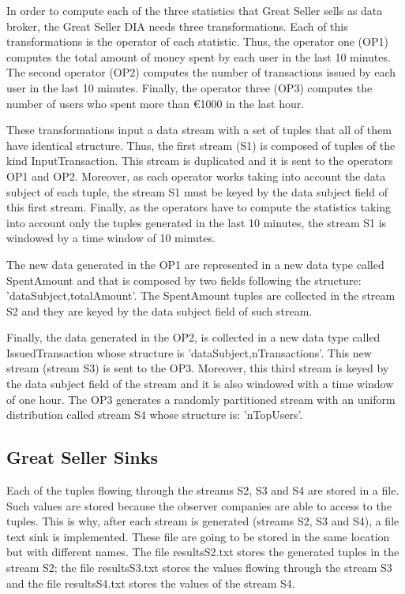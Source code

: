 In order to compute each of the three statistics that Great Seller sells as data broker, the Great Seller DIA needs three transformations. Each of this transformations is the operator of each statistic. Thus, the operator one (OP1) computes the total amount of money spent by each user in the last 10 minutes. The second operator (OP2) computes the number of transactions issued by each user in the last 10 minutes. Finally, the operator three (OP3) computes the number of users who spent more than \euro{1000} in the last hour.

These transformations input a data stream with a set of tuples that all of them have identical structure. Thus, the first stream (S1) is composed of tuples of the kind InputTransaction. This stream is duplicated and it is sent to the operators OP1 and OP2. Moreover, as each operator works taking into account the data subject of each tuple, the stream S1 must be keyed by the data subject field of this first stream. Finally, as the operators have to compute the statistics taking into account only the tuples generated in the last 10 minutes, the stream S1 is windowed by a time window of 10 minutes.

The new data generated in the OP1 are represented in a new data type called SpentAmount and that is composed by two fields following the structure: 'dataSubject,totalAmount'. The SpentAmount tuples are collected in the stream S2 and they are keyed by the data subject field of such stream.

Finally, the data generated in the OP2, is collected in a new data type called IssuedTransaction whose structure is 'dataSubject,nTransactions'. This new stream (stream S3) is sent to the OP3. Moreover, this third stream is keyed by the data subject field of the stream and it is also windowed with a time window of one hour. The OP3 generates a randomly partitioned stream with an uniform distribution called stream S4 whose structure is: 'nTopUsers'.

\subsection{Great Seller Sinks}

Each of the tuples flowing through the streams S2, S3 and S4 are stored in a file. Such values are stored because the observer companies are able to access to the tuples. This is why, after each stream is generated (streams S2, S3 and S4), a file text sink is implemented. These file are going to be stored in the same location but with different names. The file resultsS2.txt stores the generated tuples in the stream S2; the file resultsS3.txt stores the values flowing through the stream S3 and the file resultsS4.txt stores the values of the stream S4.

